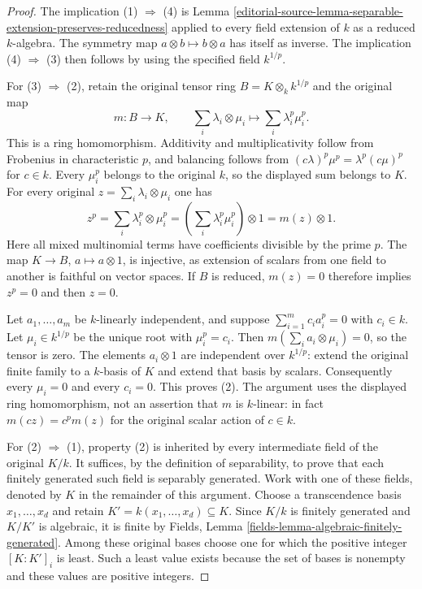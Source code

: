 \begin{proof}
The implication (1) $\Rightarrow$ (4) is Lemma
\ref{editorial-source-lemma-separable-extension-preserves-reducedness}
applied to every field extension of $k$ as a reduced
$k$-algebra. The symmetry map $a\otimes b\mapsto b\otimes a$
has itself as inverse. The implication (4) $\Rightarrow$ (3)
then follows by using the specified field $k^{1/p}$.

For (3) $\Rightarrow$ (2), retain the original tensor
ring $B=K\otimes_k k^{1/p}$ and the original map
$$
m:B\longrightarrow K,\qquad
\sum_i\lambda_i\otimes\mu_i\longmapsto
\sum_i\lambda_i^p\mu_i^p.
$$
This is a ring homomorphism. Additivity and multiplicativity
follow from Frobenius in characteristic $p$, and balancing
follows from
$(c\lambda)^p\mu^p=\lambda^p(c\mu)^p$ for $c\in k$.
Every $\mu_i^p$ belongs to the original $k$, so the
displayed sum belongs to $K$. For every original
$z=\sum_i\lambda_i\otimes\mu_i$ one has
$$
z^p=\sum_i\lambda_i^p\otimes\mu_i^p
=\left(\sum_i\lambda_i^p\mu_i^p\right)\otimes1
=m(z)\otimes1.
$$
Here all mixed multinomial terms have coefficients
divisible by the prime $p$. The map
$K\to B$, $a\mapsto a\otimes1$, is injective, as
extension of scalars from one field to another is
faithful on vector spaces. If $B$ is reduced, $m(z)=0$
therefore implies $z^p=0$ and then $z=0$.

Let $a_1,\ldots,a_m$ be $k$-linearly independent,
and suppose $\sum_{i=1}^m c_i a_i^p=0$ with $c_i\in k$.
Let $\mu_i\in k^{1/p}$ be the unique root with
$\mu_i^p=c_i$. Then
$m(\sum_i a_i\otimes\mu_i)=0$, so the tensor is zero.
The elements $a_i\otimes1$ are independent over
$k^{1/p}$: extend the original finite family to a
$k$-basis of $K$ and extend that basis by scalars.
Consequently every $\mu_i=0$ and every $c_i=0$.
This proves (2). The argument uses the displayed
ring homomorphism, not an assertion that $m$ is
$k$-linear: in fact $m(cz)=c^p m(z)$ for the
original scalar action of $c\in k$.

For (2) $\Rightarrow$ (1), property (2) is inherited
by every intermediate field of the original $K/k$.
It suffices, by the definition of separability, to
prove that each finitely generated such field is
separably generated. Work with one of these fields,
denoted by $K$ in the remainder of this argument.
Choose a transcendence basis $x_1,\ldots,x_d$ and
retain $K'=k(x_1,\ldots,x_d)\subseteq K$. Since
$K/k$ is finitely generated and $K/K'$ is algebraic,
it is finite by Fields, Lemma
\ref{fields-lemma-algebraic-finitely-generated}.
Among these original bases choose one for which
the positive integer $[K:K']_i$ is least. Such a
least value exists because the set of bases is
nonempty and these values are positive integers.


\end{proof}
